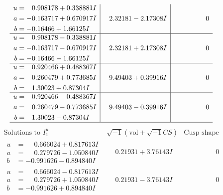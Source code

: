 \documentclass[1p]{elsarticle_modified}
\theoremstyle{definition}
\newcommand{\I}{\sqrt{-1}}
\begin{document}
$$\begin{array}{c|c|c}
\begin{aligned}
u &= \phantom{-}0.908178 + 0.338881 I \\
a &= -0.163717 + 0.670917 I \\
b &= -0.16466 + 1.66125 I\end{aligned}
 & \phantom{-}2.32181 - 2.17308 I & \phantom{-0.000000 } 0 \\ \hline\begin{aligned}
u &= \phantom{-}0.908178 - 0.338881 I \\
a &= -0.163717 - 0.670917 I \\
b &= -0.16466 - 1.66125 I\end{aligned}
 & \phantom{-}2.32181 + 2.17308 I & \phantom{-0.000000 } 0 \\ \hline\begin{aligned}
u &= \phantom{-}0.920466 + 0.488367 I \\
a &= \phantom{-}0.260479 + 0.773685 I \\
b &= \phantom{-}1.30023 + 0.87304 I\end{aligned}
 & \phantom{-}9.49403 + 0.39916 I & \phantom{-0.000000 } 0 \\ \hline\begin{aligned}
u &= \phantom{-}0.920466 - 0.488367 I \\
a &= \phantom{-}0.260479 - 0.773685 I \\
b &= \phantom{-}1.30023 - 0.87304 I\end{aligned}
 & \phantom{-}9.49403 - 0.39916 I & \phantom{-0.000000 } 0\\
 \hline 
 \end{array}$$\newpage$$\begin{array}{c|c|c}  
\text{Solutions to }I^u_{1}& \I (\text{vol} + \sqrt{-1}CS) & \text{Cusp shape}\\
 \hline 
\begin{aligned}
u &= \phantom{-}0.666024 + 0.817613 I \\
a &= \phantom{-}0.279726 - 1.050840 I \\
b &= -0.991626 - 0.894840 I\end{aligned}
 & \phantom{-}0.21931 + 3.76143 I & \phantom{-0.000000 } 0 \\ \hline\begin{aligned}
u &= \phantom{-}0.666024 - 0.817613 I \\
a &= \phantom{-}0.279726 + 1.050840 I \\
b &= -0.991626 + 0.894840 I\end{aligned}
 & \phantom{-}0.21931 - 3.76143 I & \phantom{-0.000000 } 0 \\ \hline\begin{aligned}

\end{aligned}
\end{array}$$
\end{document}
